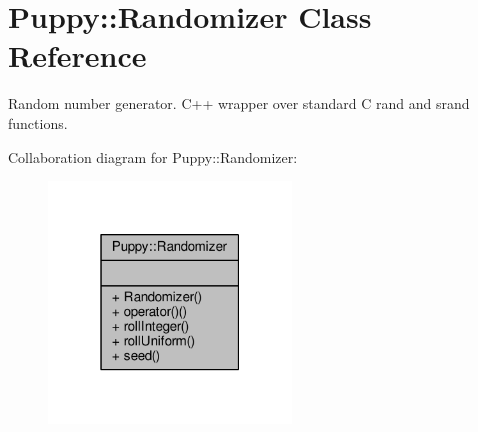 \hypertarget{classPuppy_1_1Randomizer}{}\section{Puppy\+:\+:Randomizer Class Reference}
\label{classPuppy_1_1Randomizer}


Random number generator. C++ wrapper over standard C rand and srand functions.  




Collaboration diagram for Puppy\+:\+:Randomizer\+:
\nopagebreak
\begin{figure}[H]
\begin{center}
\leavevmode
\includegraphics[width=183pt]{classPuppy_1_1Randomizer__coll__graph}
\end{center}
\end{figure}
